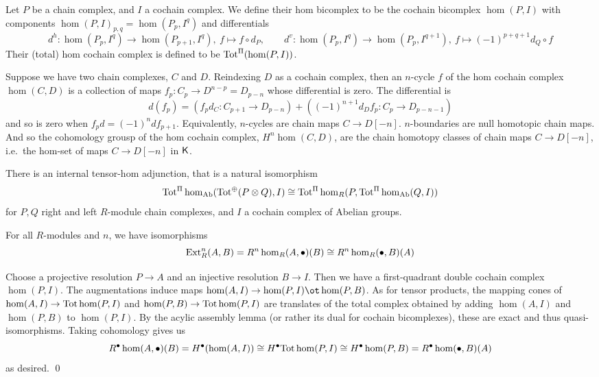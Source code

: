 \eproof

\bdefn

    Let $P$ be a chain complex, and $I$ a cochain complex.
    We define their {\emphcolor hom bicomplex} to be the cochain bicomplex $\hom(P,I)$ with components $\hom(P,I)_{p,q}=\hom(P_p,I^q)$ and differentials
    $$ d^h\colon\hom(P_p,I^q)\to\hom(P_{p+1},I^q),\ f\mapsto f\circ d_P,\qquad d^v\colon\hom(P_p,I^q)\to\hom(P_p,I^{q+1}),\ f\mapsto (-1)^{p+q+1}d_Q\circ f $$
    Their {\emphcolor (total) hom cochain complex} is defined to be ${\rm Tot}^\Pi(\hom(P,I))$.

\edefn

Suppose we have two chain complexes, $C$ and $D$.
Reindexing $D$ as a cochain complex, then an $n$-cycle $f$ of the hom cochain complex $\hom(C,D)$ is a collection of maps $f_p\colon C_p\to D^{n-p}=D_{p-n}$ whose differential is zero.
The differential is
$$ d(f_p) = (f_pd_C\colon C_{p+1}\to D_{p-n}) + ((-1)^{n+1}d_Df_p\colon C_p\to D_{p-n-1}) $$
and so is zero when $f_pd=(-1)^ndf_{p+1}$.
Equivalently, $n$-cycles are chain maps $C\to D[-n]$.
$n$-boundaries are null homotopic chain maps.
And so the cohomology grousp of the hom cochain complex, $H^n\hom(C,D)$, are the chain homotopy classes of chain maps $C\to D[-n]$, i.e.\ the hom-set of maps $C\to D[-n]$ in ${\sf K}$.

\bprop

    There is an internal tensor-hom adjunction, that is a natural isomorphism
    $$ {\rm Tot}^\Pi\hom_{\rm Ab}({\rm Tot}^\oplus(P\otimes Q),I) \cong {\rm Tot}^\Pi\hom_R(P,{\rm Tot}^\Pi\hom_{\rm Ab}(Q,I)) $$
    for $P,Q$ right and left $R$-module chain complexes, and $I$ a cochain complex of Abelian groups.

\eprop

\bthrm

    For all $R$-modules and $n$, we have isomorphisms
    $$ {\rm Ext}^n_R(A,B) = R^n\hom_R(A,\bullet)(B) \cong R^n\hom_R(\bullet,B)(A) $$

\ethrm

\bproof

    Choose a projective resolution $P\to A$ and an injective resolution $B\to I$.
    Then we have a first-quadrant double cochain complex $\hom(P,I)$.
    The augmentations induce maps $\hom(A,I)\to\hom(P,I)\ot\hom(P,B)$.
    As for tensor products, the mapping cones of $\hom(A,I)\to{\rm Tot}\hom(P,I)$ and $\hom(P,B)\to{\rm Tot}\hom(P,I)$ are translates of the total complex obtained by
    adding $\hom(A,I)$ and $\hom(P,B)$ to $\hom(P,I)$.
    By the acylic assembly lemma (or rather its dual for cochain bicomplexes), these are exact and thus quasi-isomorphisms.
    Taking cohomology gives us
    $$ R^\bullet\hom(A,\bullet)(B) = H^\bullet(\hom(A,I)) \cong H^\bullet{\rm Tot}\hom(P,I) \cong H^\bullet\hom(P,B) = R^\bullet\hom(\bullet,B)(A) $$
    as desired.
    \qed

